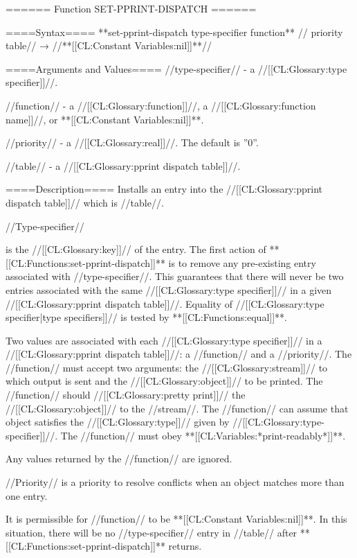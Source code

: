 ====== Function SET-PPRINT-DISPATCH ======

====Syntax====
**set-pprint-dispatch {type-specifier function** //\opt} priority table// → //**[[CL:Constant Variables:nil]]**//

====Arguments and Values====
//type-specifier// - a //[[CL:Glossary:type specifier]]//.

//function// - a //[[CL:Glossary:function]]//, a //[[CL:Glossary:function name]]//, or **[[CL:Constant Variables:nil]]**.

//priority// - a //[[CL:Glossary:real]]//. The default is ''0''.

//table// - a //[[CL:Glossary:pprint dispatch table]]//. 

====Description====
Installs an entry into the //[[CL:Glossary:pprint dispatch table]]// which is //table//.

//Type-specifier//

is the //[[CL:Glossary:key]]// of the entry. The first action of **[[CL:Functions:set-pprint-dispatch]]** is to remove any pre-existing entry associated with //type-specifier//. This guarantees that there will never be two entries associated with the same //[[CL:Glossary:type specifier]]// in a given //[[CL:Glossary:pprint dispatch table]]//. Equality of //[[CL:Glossary:type specifier|type specifiers]]// is tested by **[[CL:Functions:equal]]**.

Two values are associated with each //[[CL:Glossary:type specifier]]// in a //[[CL:Glossary:pprint dispatch table]]//: a //function// and a //priority//. The //function// must accept two arguments: the //[[CL:Glossary:stream]]// to which output is sent and the //[[CL:Glossary:object]]// to be printed. The //function// should //[[CL:Glossary:pretty print]]// the //[[CL:Glossary:object]]// to the //stream//. The //function// can assume that object satisfies the //[[CL:Glossary:type]]// given by //[[CL:Glossary:type-specifier]]//. The //function// must obey **[[CL:Variables:*print-readably*]]**.

Any values returned by the //function// are ignored.

//Priority// is a priority to resolve conflicts when an object matches more than one entry.

It is permissible for //function// to be **[[CL:Constant Variables:nil]]**. In this situation, there will be no //type-specifier// entry in //table// after **[[CL:Functions:set-pprint-dispatch]]** returns.

